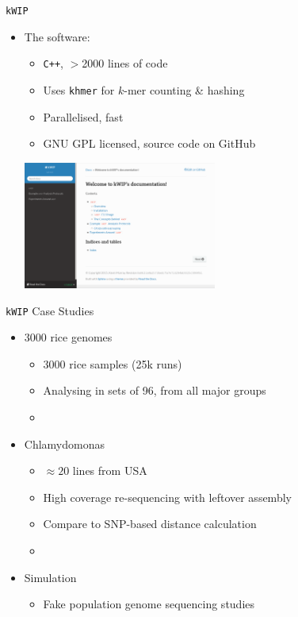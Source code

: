 \documentclass[t]{beamer}
\begin{document}
\begin{frame}{\texttt{kWIP}}
  \begin{itemize}
    \item The software:
      \begin{itemize}
        \item \texttt{C++}, $>$2000 lines of code
        \item Uses \texttt{khmer} for $k$-mer counting \& hashing
        \item Parallelised, fast
        \item GNU GPL licensed, source code on GitHub
      \end{itemize}
      \begin{center}
        \includegraphics[width=0.5\textwidth]{img/kwip-doc-screenshot.png}
      \end{center}
  \end{itemize}
\end{frame}

\begin{frame}{\texttt{kWIP} Case Studies}
  \begin{itemize}
    \item 3000 rice genomes
      \begin{itemize}
        \item 3000 rice samples (25k runs)
        \item Analysing in sets of 96, from all major groups
        \item \textcite{the_3000_rice_genomes_project_3000_2014}
      \end{itemize}
    \item Chlamydomonas
      \begin{itemize}
        \item $\approx 20$ lines from USA
        \item High coverage re-sequencing with leftover assembly
        \item Compare to SNP-based distance calculation
        \item \textcite{flowers_whole-genome_2015}
      \end{itemize}
    \item Simulation
      \begin{itemize}
        \item Fake population genome sequencing studies
      \end{itemize}
  \end{itemize}
\end{frame}
\end{document}
